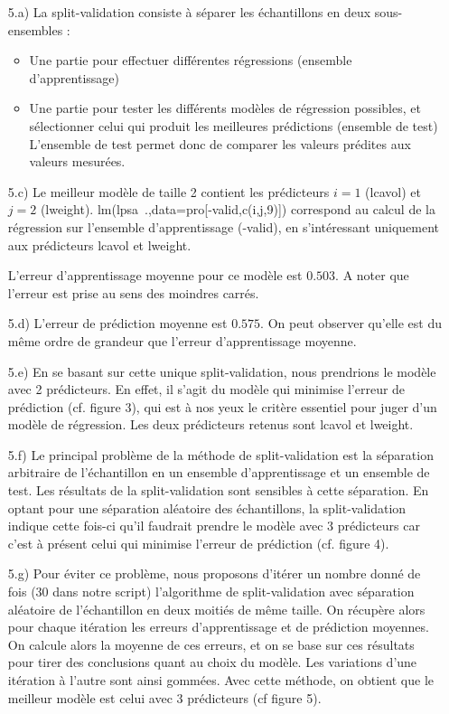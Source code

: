 \documentclass[a4paper, 12pt]{article}
\begin{document}
\begin{enumerate}
\setlength{\itemsep}{20pt}

\item[5.a)] La split-validation consiste à séparer les échantillons en deux sous-ensembles :

\begin{itemize}
\item Une partie pour effectuer différentes régressions (ensemble d'apprentissage)
\item Une partie pour tester les différents modèles de régression possibles, et sélectionner celui qui produit les meilleures prédictions (ensemble de test)
L'ensemble de test permet donc de comparer les valeurs prédites aux valeurs mesurées.
\end{itemize}

\item[5.c)] Le meilleur modèle de taille 2 contient les prédicteurs $i = 1$ (lcavol) et $j = 2$ (lweight). lm(lpsa~.,data=pro[-valid,c(i,j,9)]) correspond au calcul de la régression sur l'ensemble d'apprentissage (-valid), en s'intéressant uniquement aux prédicteurs lcavol et lweight.

L'erreur d'apprentissage moyenne pour ce modèle est $0.503$. A noter que l'erreur est prise au sens des moindres carrés.

\item[5.d)] L'erreur de prédiction moyenne est $0.575$. On peut observer qu'elle est du même ordre de grandeur que l'erreur d'apprentissage moyenne.

\item[5.e)] En se basant sur cette unique split-validation, nous prendrions le modèle avec 2 prédicteurs. En effet, il s'agit du modèle qui minimise l'erreur de prédiction (cf. figure 3), qui est à nos yeux le critère essentiel pour juger d'un modèle de régression. Les deux prédicteurs retenus sont lcavol et lweight.

\item[5.f)] Le principal problème de la méthode de split-validation est la séparation arbitraire de l'échantillon en un ensemble d'apprentissage et un ensemble de test. Les résultats de la split-validation sont sensibles à cette séparation. En optant pour une séparation aléatoire des échantillons, la split-validation indique cette fois-ci qu'il faudrait prendre le modèle avec 3 prédicteurs car c'est à présent celui qui minimise l'erreur de prédiction (cf. figure 4).

\item[5.g)] Pour éviter ce problème, nous proposons d'itérer un nombre donné de fois (30 dans notre script) l'algorithme de split-validation avec séparation aléatoire de l'échantillon en deux moitiés de même taille. On récupère alors pour chaque itération les erreurs d'apprentissage et de prédiction moyennes. On calcule alors la moyenne de ces erreurs, et on se base sur ces résultats pour tirer des conclusions quant au choix du modèle. Les variations d'une itération à l'autre sont ainsi gommées. Avec cette méthode, on obtient que le meilleur modèle est celui avec 3 prédicteurs (cf figure 5).



\end{enumerate}
\end{document}
